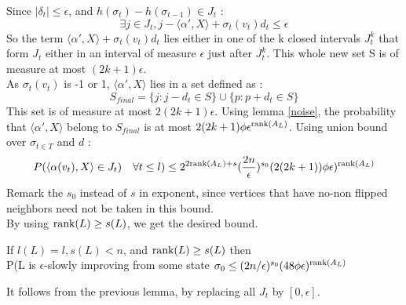 Since  $|\delta_t| \leq \epsilon$, and $h(\sigma_t) - h(\sigma_{t-1}) \in J_t$ : 
\begin{equation*}
\exists j \in J_t, j - \langle\alpha ', X \rangle +   \sigma_t(v_t)d_t \leq \epsilon
\end{equation*}
So the term $\langle\alpha ', X \rangle +   \sigma_t(v_t)d_t$ lies either in one of the k closed intervals $J^k_t$ that form $J_t$ either in an interval of measure $\epsilon$ just after $J^k_t$. This whole new set S is of measure at most $(2k+ 1)\epsilon$. \\
As $\sigma_t(v_t)$ is -1 or 1, $\langle\alpha ', X \rangle$ lies in a set defined as :
\begin{equation*}
S_{final} = \{j : j - d_t \in S\} \cup \{p:  p + d_t \in S\}
\end{equation*}
This set is of measure at most $2(2k + 1) \epsilon$. Using lemma \ref{noise}, the probability that $\langle\alpha ', X \rangle$ belong to $S_{final}$ is at most $2(2k + 1)\phi\epsilon^{\text{rank}(A_L)}$. Using union bound over $\sigma_{t \in T}$ and $d$ :
\begin{equation*}
P(\langle \alpha(v_t), X \rangle \in J_t) \quad \forall t\leq l) \leq 2^{2\text{rank}(A_L) + s}(\frac{2n}{\epsilon})^{s_0}(2(2k+1))\phi\epsilon)^{\text{rank}(A_L)}
\end{equation*}
Remark the $s_0$ instead of $s$ in exponent, since vertices that have no-non flipped neighbors need not be taken in this bound. \\
By using  $\text{rank}(L) \geq s(L)$, we get the desired bound. \\

\begin{corollary}
\label{cor::boundN}
If $l(L) = l, s(L) < n$, and $\text{rank}(L) \geq s(L)$ then \\
P(L is $\epsilon$-slowly improving from some state $\sigma_0 \leq (2n/\epsilon)^{s_0}(48\phi\epsilon)^{\text{rank}(A_L)}$
\end{corollary}

It follows from the previous lemma, by replacing all $J_t$ by $[0, \epsilon]$.